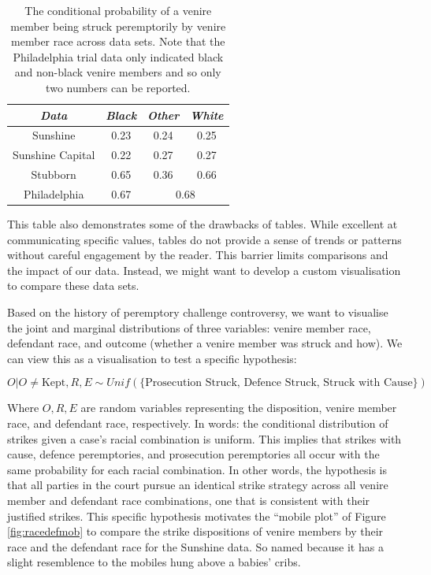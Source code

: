 \documentclass[12pt]{article}
\begin{document}
\begin{table}[h!]
  \centering
  \caption[Strike Rate by Race]{\footnotesize The conditional probability of a venire member being struck peremptorily by venire member race across data sets. Note that the Philadelphia trial data only indicated black and non-black venire members and so only two numbers can be reported.} \label{tab:margrace}
  \begin{tabular}{|c|c c c|} \hline
    \textit{Data} & \textit{Black} & \textit{Other} & \textit{White} \\ \hline
    Sunshine & 0.23 & 0.24 & 0.25 \\
    Sunshine Capital & 0.22 & 0.27 & 0.27 \\
    Stubborn & 0.65 & 0.36 & 0.66 \\ 
    Philadelphia & 0.67 & \multicolumn{2}{c|}{0.68} \\ \hline
  \end{tabular}
\end{table}

This table also demonstrates some of the drawbacks of tables. While excellent at communicating specific values, tables do not provide a sense of trends or patterns without careful engagement by the reader. This barrier limits comparisons and the impact of our data. Instead, we might want to develop a custom visualisation to compare these data sets.

Based on the history of peremptory challenge controversy, we want to visualise the joint and marginal distributions of three variables: venire member race, defendant race, and outcome (whether a venire member was struck and how). We can view this as a visualisation to test a specific hypothesis:

\begin{equation}
  \label{eq:vishyp}
  O | O \neq \text{Kept}, R, E \sim Unif(\{\text{Prosecution
    Struck, Defence Struck, Struck with Cause}\})
\end{equation}

Where $O, R, E$ are random variables representing the disposition, venire member race, and defendant race, respectively. In words: the conditional distribution of strikes given a case's racial combination is uniform. This implies that strikes with cause, defence peremptories, and prosecution peremptories all occur with the same probability for each racial combination. In other words, the hypothesis is that all parties in the court pursue an identical strike strategy across all venire member and defendant race combinations, one that is consistent with their justified strikes. This specific hypothesis motivates the ``mobile plot'' of Figure \ref{fig:racedefmob} to compare the strike dispositions of venire members by their race and the defendant race for the Sunshine data. So named because it has a slight resemblence to the mobiles hung above a babies' cribs.
\end{document}
